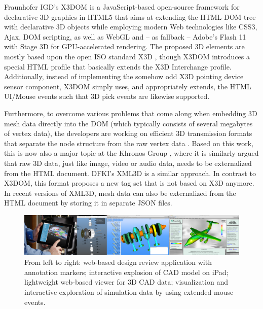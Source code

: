 \documentclass[review]{acmsiggraph}
\begin{document}
Fraunhofer IGD's X3DOM \cite{Behr2009,Behr12} is a JavaScript-based open-source framework for declarative 3D graphics in HTML5 that aims at extending the HTML DOM tree with declarative 3D objects while employing modern Web technologies like CSS3, Ajax, DOM scripting, as well as WebGL and -- as fallback -- Adobe's Flash 11 with Stage 3D \cite{flash} for GPU-accelerated rendering. The proposed 3D elements are mostly based upon the open ISO standard X3D \cite{Web3D-X3D}, though X3DOM introduces a special HTML profile that basically extends the X3D Interchange profile. Additionally, instead of implementing the somehow odd X3D pointing device sensor component, X3DOM simply uses, and appropriately extends, the HTML UI/Mouse events such that 3D pick events are likewise supported.

Furthermore, to overcome various problems that come along when embedding 3D mesh data directly into the DOM (which typically consists of several megabytes of vertex data), the developers are working on efficient 3D transmission formats that separate the node structure from the raw vertex data \cite{Behr12}. Based on this work, this is now also a major topic at the Khronos Group \cite{Trevett12}, where it is similarly argued that raw 3D data, just like image, video or audio data, needs to be externalized from the HTML document.
DFKI's XML3D \cite{Sons2010} is a similar approach. In contrast to X3DOM, this format proposes a new tag set that is not based on X3D anymore. In recent versions of XML3D, mesh data can also be externalized from the HTML document by storing it in separate JSON files.


\begin{figure}
  \centering
  \includegraphics[width=1.0\textwidth]{images/cad_apps.png}
  \caption{From left to right: web-based design review application with annotation markers; interactive explosion of CAD model on iPad; lightweight web-based viewer for 3D CAD data; visualization and interactive exploration of simulation data by using extended mouse events.}
  \label{fig:cadApps}
  \vspace{-0.2cm}
\end{figure}
\end{document}
